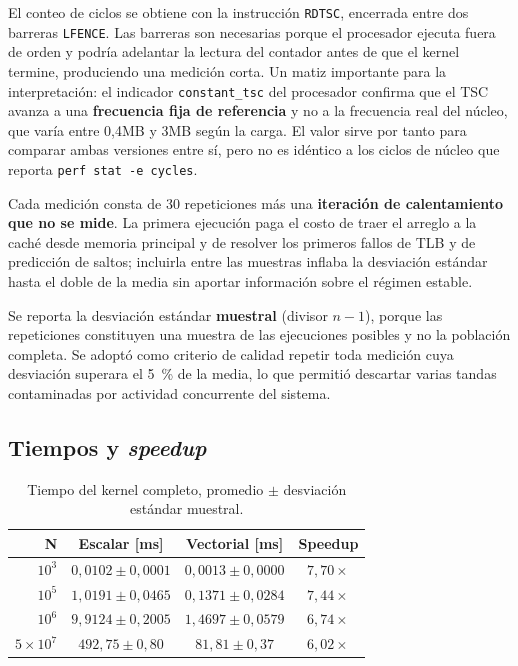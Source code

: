 \documentclass[journal]{IEEEtran}
\begin{document}
El conteo de ciclos se obtiene con la instrucción \texttt{RDTSC},
encerrada entre dos barreras \texttt{LFENCE}. Las barreras son necesarias
porque el procesador ejecuta fuera de orden y podría adelantar la lectura
del contador antes de que el kernel termine, produciendo una medición
corta. Un matiz importante para la interpretación: el indicador
\texttt{constant\_tsc} del procesador confirma que el TSC avanza a una
\textbf{frecuencia fija de referencia} y no a la frecuencia real del
núcleo, que varía entre 0,4MB y 3MB según la carga.
El valor sirve por tanto para comparar ambas versiones entre sí, pero no
es idéntico a los ciclos de núcleo que reporta
\texttt{perf stat -e cycles}.

Cada medición consta de 30 repeticiones más una \textbf{iteración de
calentamiento que no se mide}. La primera ejecución paga el costo de
traer el arreglo a la caché desde memoria principal y de resolver los
primeros fallos de TLB y de predicción de saltos; incluirla entre las
muestras inflaba la desviación estándar hasta el doble de la media sin
aportar información sobre el régimen estable.

Se reporta la desviación estándar \textbf{muestral} (divisor $n-1$),
porque las repeticiones constituyen una muestra de las ejecuciones posibles
y no la población completa. Se adoptó como criterio de calidad repetir
toda medición cuya desviación superara el \SI{5}{\percent} de la media, lo que
permitió descartar varias tandas contaminadas por actividad concurrente
del sistema.

\subsection{Tiempos y \textit{speedup}}

\begin{table}[ht]
\centering
\caption{Tiempo del kernel completo, promedio $\pm$ desviación
  estándar muestral.}
\label{tab:tiempos}
\footnotesize
\setlength{\tabcolsep}{3pt}
\begin{tabular}{|r|c|c|c|}
\hline
\textbf{N} & \textbf{Escalar [ms]} & \textbf{Vectorial [ms]} & \textbf{Speedup} \\ \hline
$10^3$         & $0,0102 \pm 0,0001$   & $0,0013 \pm 0,0000$  & $7,70\times$ \\ \hline
$10^5$         & $1,0191 \pm 0,0465$   & $0,1371 \pm 0,0284$  & $7,44\times$ \\ \hline
$10^6$         & $9,9124 \pm 0,2005$   & $1,4697 \pm 0,0579$  & $6,74\times$ \\ \hline
$5\times10^7$  & $492,75 \pm 0,80$     & $81,81 \pm 0,37$     & $6,02\times$ \\ \hline
\end{tabular}
\end{table}
\end{document}
